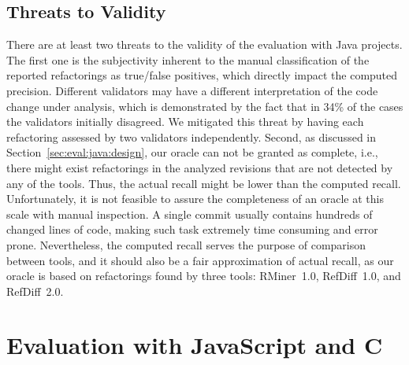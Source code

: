 \documentclass[10pt,journal,compsoc]{IEEEtran}
\begin{document}
\subsection{Threats to Validity}
\label{SecThreatsJava}

There are at least two threats to the validity of the evaluation with Java projects.
The first one is the subjectivity inherent to the manual classification of the reported refactorings as true/false positives, which directly impact the computed precision.
Different validators may have a different interpretation of the code change under analysis, which is demonstrated by the fact that in 34\% of the cases the validators initially disagreed.
We mitigated this threat by having each refactoring assessed by two validators independently.
Second, as discussed in Section~\ref{sec:eval:java:design}, our oracle can not be granted as complete, i.e., there might exist refactorings in the analyzed revisions that are not detected by any of the tools.
Thus, the actual recall might be lower than the computed recall.
Unfortunately, it is not feasible to assure the completeness of an oracle at this scale with manual inspection.
A single commit usually contains hundreds of changed lines of code, making such task extremely time consuming and error prone.
Nevertheless, the computed recall serves the purpose of comparison between tools, and it should also be a fair approximation of actual recall, as our oracle is based on refactorings found by three tools: RMiner~1.0, RefDiff~1.0, and RefDiff~2.0.






\section{Evaluation with JavaScript and C}
\label{sec:eval:js:c}
\end{document}
